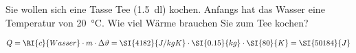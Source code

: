 
\begin{aufgabe}
Sie wollen sich eine Tasse Tee (\SI{1.5}{dl}) kochen. 
Anfangs hat das Wasser eine Temperatur von \SI{20}{\celsius}.
Wie viel Wärme brauchen Sie zum Tee kochen?


\begin{loesung}
\begin{eqnarray*}
Q=\RI{c}{Wasser}\cdot m\cdot \Delta\vartheta=\SI{4182}{J/kg K}\cdot\SI{0.15}{kg}\cdot\SI{80}{K}=\SI{50184}{J}
\end{eqnarray*}
\end{loesung}

\end{aufgabe}

